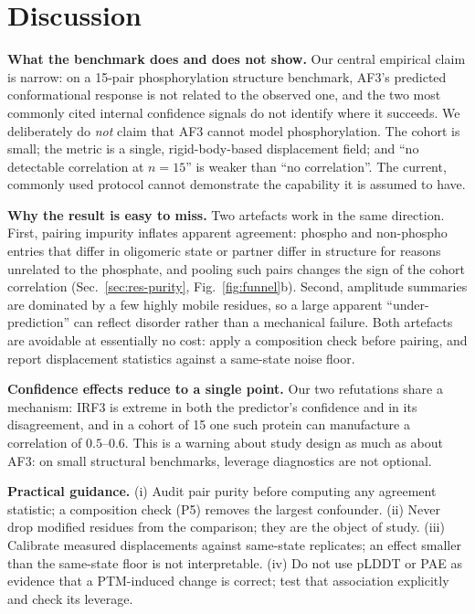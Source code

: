 \section{Discussion}
\label{sec:discussion}

\noindent\textbf{What the benchmark does and does not show.} Our central
empirical claim is narrow: on a 15-pair phosphorylation structure
benchmark, AF3's predicted conformational response is not related to the
observed one, and the two most commonly cited internal confidence signals
do not identify where it succeeds. We deliberately do \emph{not} claim
that AF3 cannot model phosphorylation. The cohort is small; the metric is
a single, rigid-body-based displacement field; and ``no detectable
correlation at $n=15$'' is weaker than ``no correlation''. The current,
commonly used protocol cannot demonstrate the capability it is assumed to
have.

\noindent\textbf{Why the result is easy to miss.} Two artefacts work in
the same direction. First, pairing impurity inflates apparent agreement:
phospho and non-phospho entries that differ in oligomeric state or partner
differ in structure for reasons unrelated to the phosphate, and pooling
such pairs changes the sign of the cohort correlation
(Sec.~\ref{sec:res-purity}, Fig.~\ref{fig:funnel}b). Second, amplitude
summaries are dominated by a few highly mobile residues, so a large
apparent ``under-prediction'' can reflect disorder rather than a mechanical
failure. Both artefacts are avoidable at essentially no cost: apply a
composition check before pairing, and report displacement statistics
against a same-state noise floor.

\noindent\textbf{Confidence effects reduce to a single point.} Our two refutations share
a mechanism: IRF3 is extreme in both the predictor's confidence and in
its disagreement, and in a cohort of 15 one such protein can manufacture
a correlation of $0.5$--$0.6$. This is a warning
about study design as much as about AF3: on small structural benchmarks,
leverage diagnostics are not optional.

\noindent\textbf{Practical guidance.} (i) Audit pair purity before
computing any agreement statistic; a composition check (P5) removes the
largest confounder. (ii) Never drop modified residues from the comparison;
they are the object of study. (iii) Calibrate measured displacements
against same-state replicates; an effect smaller than the same-state floor
is not interpretable. (iv) Do not use pLDDT or PAE as evidence that a
PTM-induced change is correct; test that association explicitly and check
its leverage.

